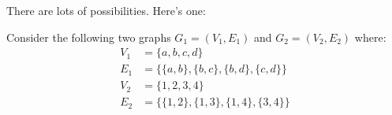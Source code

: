 \documentclass[a4paper, 12pt]{exam}
\begin{document}
\begin{questions}
	\begin{solution}
		There are lots of possibilities. Here's one:
		\begin{center}
  	 \begin{adjustbox}{max width=0.6\textwidth}
			\end{adjustbox}
		\end{center}

	\end{solution}

\question
  Consider the following two graphs $G_1 = (V_1,E_1)$ and $G_2 = (V_2,E_2)$ where:
  \begin{align*}
    V_1 &= \{a,b,c,d\} \\
    E_1 &= \{\{a,b\},\{b,c\},\{b,d\},\{c,d\}\}\\
    V_2 &= \{1,2,3,4\} \\
    E_2 &= \{\{1,2\},\{1,3\},\{1,4\},\{3,4\}\}
  \end{align*}

  \begin{parts}

\end{parts}
\end{questions}
\end{document}

